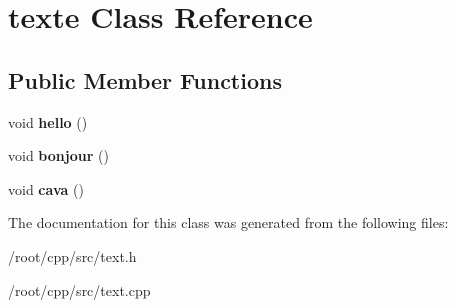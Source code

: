 \hypertarget{classtexte}{}\section{texte Class Reference}
\label{classtexte}
\subsection*{Public Member Functions}
\begin{DoxyCompactItemize}
\item 
\mbox{\label{classtexte_acdc1e996628c96dc4d2b0ad7e4ce802f}} 
void {\bfseries hello} ()
\item 
\mbox{\label{classtexte_a637e30a95893ab0246b1bd0faff35b86}} 
void {\bfseries bonjour} ()
\item 
\mbox{\label{classtexte_afa0e63c849bab06ba927e447cb4dada3}} 
void {\bfseries cava} ()
\end{DoxyCompactItemize}


The documentation for this class was generated from the following files\+:\begin{DoxyCompactItemize}
\item 
/root/cpp/src/text.\+h\item 
/root/cpp/src/text.\+cpp\end{DoxyCompactItemize}
